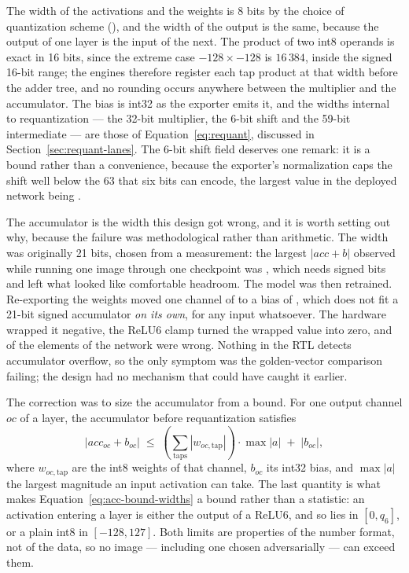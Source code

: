 The width of the activations and the weights is 8 bits by the choice of
quantization scheme (), and the width of the output is the same,
because the output of one layer is the input of the next. The product of two
int8 operands is exact in 16 bits, since the extreme case $-128 \times -128$
is $16\,384$, inside the signed 16-bit range; the engines therefore register
each tap product at that width before the adder tree, and no rounding occurs
anywhere between the multiplier and the accumulator. The bias is int32 as the
exporter emits it, and the widths internal to requantization --- the 32-bit
multiplier, the 6-bit shift and the 59-bit intermediate --- are those of
Equation~\eqref{eq:requant}, discussed in Section~\ref{sec:requant-lanes}. The
6-bit shift field deserves one remark: it is a bound rather than a convenience,
because the exporter's normalization caps the shift well below the 63 that six
bits can encode, the largest value in the deployed network being \thMaxShift.

The accumulator is the width this design got wrong, and it is worth setting out
why, because the failure was methodological rather than arithmetic. The width
was originally 21 bits, chosen from a measurement: the largest
$|acc + b|$ observed while running one image through one checkpoint was
\thAccMeasured, which needs \thAccMeasuredBits{} signed bits and left what
looked like comfortable headroom. The model was then retrained. Re-exporting
the weights moved one channel of  to a bias of
\thBadBias, which does not fit a 21-bit signed accumulator \emph{on its own},
for any input whatsoever. The hardware wrapped it negative, the ReLU6 clamp
turned the wrapped value into zero, and \thBadElements{} of the
\thElements{} elements of the network were wrong. Nothing in the RTL detects
accumulator overflow, so the only symptom was the golden-vector comparison
failing; the design had no mechanism that could have caught it earlier.

The correction was to size the accumulator from a bound. For one output
channel $oc$ of a layer, the accumulator before requantization satisfies
\begin{equation}
  \left| acc_{oc} + b_{oc} \right| \;\le\;
  \left( \sum_{\mathrm{taps}} \left| w_{oc,\mathrm{tap}} \right| \right)
  \cdot \max |a| \;+\; \left| b_{oc} \right| ,
  \label{eq:acc-bound-widths}
\end{equation}
where $w_{oc,\mathrm{tap}}$ are the int8 weights of that channel, $b_{oc}$ its
int32 bias, and $\max |a|$ the largest magnitude an input activation can take.
The last quantity is what makes Equation~\eqref{eq:acc-bound-widths} a bound
rather than a statistic: an activation entering a layer is either the output of
a ReLU6, and so lies in $[0, q_6]$, or a plain int8 in $[-128, 127]$. Both
limits are properties of the number format, not of the data, so no image ---
including one chosen adversarially --- can exceed them.

